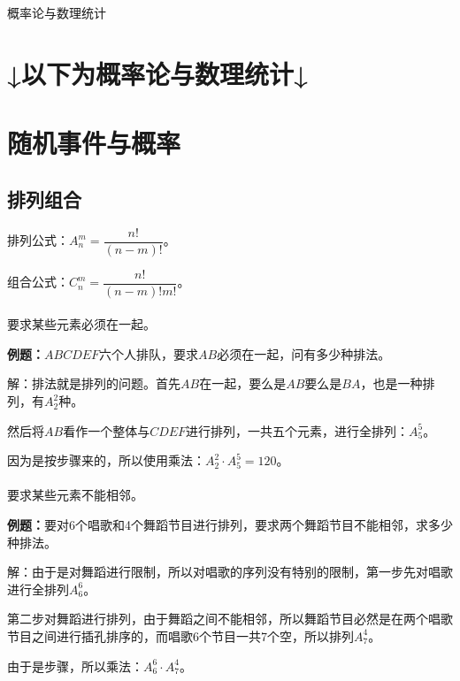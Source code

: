 \newpage
\begin{center}
    {概率论与数理统计}
\end{center}
\newpage
\section{↓以下为概率论与数理统计↓}
\section{随机事件与概率}
\subsection{排列组合}

排列公式：$A_n^m=\dfrac{n!}{(n-m)!}$。

组合公式：$C_n^m=\dfrac{n!}{(n-m)!m!}$。

\paragraph{}

要求某些元素必须在一起。

\textbf{例题：}$ABCDEF$六个人排队，要求$AB$必须在一起，问有多少种排法。

解：排法就是排列的问题。首先$AB$在一起，要么是$AB$要么是$BA$，也是一种排列，有$A_2^2$种。

然后将$AB$看作一个整体与$CDEF$进行排列，一共五个元素，进行全排列：$A_5^5$。

因为是按步骤来的，所以使用乘法：$A_2^2\cdot A_5^5=120$。

\paragraph{}

要求某些元素不能相邻。

\textbf{例题：}要对6个唱歌和4个舞蹈节目进行排列，要求两个舞蹈节目不能相邻，求多少种排法。

解：由于是对舞蹈进行限制，所以对唱歌的序列没有特别的限制，第一步先对唱歌进行全排列$A_6^6$。

第二步对舞蹈进行排列，由于舞蹈之间不能相邻，所以舞蹈节目必然是在两个唱歌节目之间进行插孔排序的，而唱歌6个节目一共7个空，所以排列$A_7^4$。

由于是步骤，所以乘法：$A_6^6\cdot A_7^4$。

\paragraph{}

